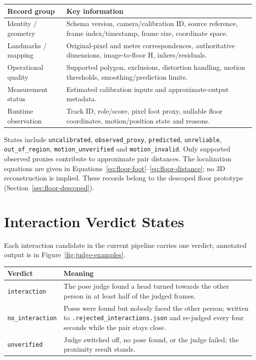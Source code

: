 \begin{tabular}{P{0.28\textwidth}P{0.59\textwidth}}
\toprule
Record group & Key information\\
\midrule
Identity / geometry & Schema version, camera/calibration ID, source reference, frame index/timestamp, frame size, coordinate space.\\
Landmarks / mapping & Original-pixel and metre correspondences, authoritative dimensions, image-to-floor H, inliers/residuals.\\
Operational quality & Supported polygon, exclusions, distortion handling, motion thresholds, smoothing/prediction limits.\\
Measurement status & Estimated calibration inputs and approximate-output metadata.\\
Runtime observation & Track ID, role/score, pixel foot proxy, nullable floor coordinates, motion/position state and reasons.\\
\bottomrule
\end{tabular}

States include \texttt{uncalibrated}, \texttt{observed\_proxy}, \texttt{predicted}, \texttt{unreliable}, \texttt{out\_of\_region}, \texttt{motion\_unverified} and \texttt{motion\_invalid}. Only supported observed proxies contribute to approximate pair distances. The localization equations are given in Equations~\ref{eq:floor-foot}--\ref{eq:floor-distance}; no 3D reconstruction is implied. These records belong to the descoped floor prototype (Section~\ref{sec:floor-descoped}).

\section{Interaction Verdict States}
Each interaction candidate in the current pipeline carries one verdict; annotated output is in Figure~\ref{fig:judge-examples}.

\begin{tabular}{P{0.22\textwidth}P{0.65\textwidth}}
\toprule
Verdict & Meaning\\
\midrule
\texttt{interaction} & The pose judge found a head turned towards the other person in at least half of the judged frames.\\
\texttt{no\_interaction} & Poses were found but nobody faced the other person; written to \texttt{.rejected\_interactions.json} and re-judged every four seconds while the pair stays close.\\
\texttt{unverified} & Judge switched off, no pose found, or the judge failed; the proximity result stands.\\
\bottomrule
\end{tabular}
